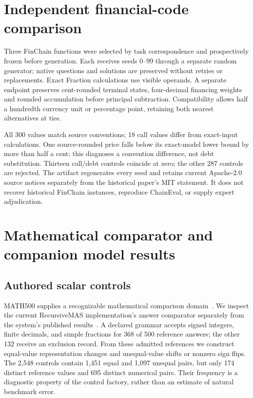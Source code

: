 \section{Independent financial-code comparison}\label{app:independent-finchain}
Three FinChain functions were selected by task correspondence and prospectively frozen before generation. Each receives seeds 0--99 through a separate random generator; native questions and solutions are preserved without retries or replacements. Exact Fraction calculations use visible operands. A separate endpoint preserves cent-rounded terminal states, four-decimal financing weights and rounded accumulation before principal subtraction. Compatibility allows half a hundredth currency unit or percentage point, retaining both nearest alternatives at ties.

All 300 values match source conventions; 18 call values differ from exact-input calculations. One source-rounded price falls below its exact-model lower bound by more than half a cent; this diagnoses a convention difference, not debt substitution. Thirteen call/debt controls coincide at zero; the other 287 controls are rejected. The artifact regenerates every seed and retains current Apache-2.0 source notices separately from the historical paper's MIT statement. It does not recover historical FinChain instances, reproduce ChainEval, or supply expert adjudication.

\section{Mathematical comparator and companion model results}\label{app:math-comparator}
\subsection{Authored scalar controls}
MATH500 supplies a recognizable mathematical comparison domain~\cite{math500}. We inspect the current RecursiveMAS implementation's answer comparator separately from the system's published results~\cite{recursivemas,recursivecode}. A declared grammar accepts signed integers, finite decimals, and simple fractions for 368 of 500 reference answers; the other 132 receive an exclusion record. From these admitted references we construct equal-value representation changes and unequal-value shifts or nonzero sign flips. The 2,548 controls contain 1,451 equal and 1,097 unequal pairs, but only 174 distinct reference values and 695 distinct numerical pairs. Their frequency is a diagnostic property of the control factory, rather than an estimate of natural benchmark error.

